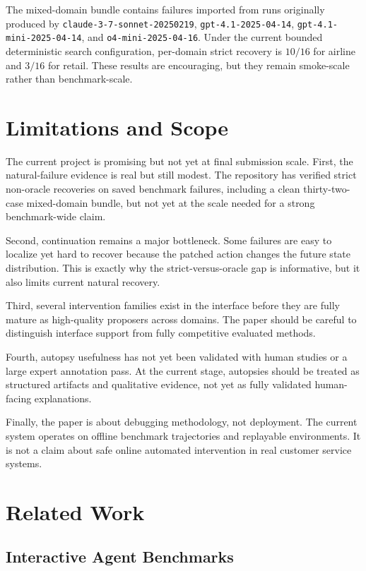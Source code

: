 \documentclass[11pt]{article}
\begin{document}
The mixed-domain bundle contains failures imported from runs originally produced
by \texttt{claude-3-7-sonnet-20250219}, \texttt{gpt-4.1-2025-04-14},
\texttt{gpt-4.1-mini-2025-04-14}, and \texttt{o4-mini-2025-04-16}. Under the
current bounded deterministic search configuration, per-domain strict recovery
is $10/16$ for airline and $3/16$ for retail. These results are encouraging,
but they remain smoke-scale rather than benchmark-scale.

\section{Limitations and Scope}

The current project is promising but not yet at final submission scale. First,
the natural-failure evidence is real but still modest. The repository has
verified strict non-oracle recoveries on saved benchmark failures, including a
clean thirty-two-case mixed-domain bundle, but not yet at the scale needed for
a strong benchmark-wide claim.

Second, continuation remains a major bottleneck. Some failures are easy to
localize yet hard to recover because the patched action changes the future
state distribution. This is exactly why the strict-versus-oracle gap is
informative, but it also limits current natural recovery.

Third, several intervention families exist in the interface before they are
fully mature as high-quality proposers across domains. The paper should be
careful to distinguish interface support from fully competitive evaluated
methods.

Fourth, autopsy usefulness has not yet been validated with human studies or a
large expert annotation pass. At the current stage, autopsies should be treated
as structured artifacts and qualitative evidence, not yet as fully validated
human-facing explanations.

Finally, the paper is about debugging methodology, not deployment. The current
system operates on offline benchmark trajectories and replayable environments.
It is not a claim about safe online automated intervention in real customer
service systems.

\section{Related Work}

\subsection{Interactive Agent Benchmarks}
\end{document}

